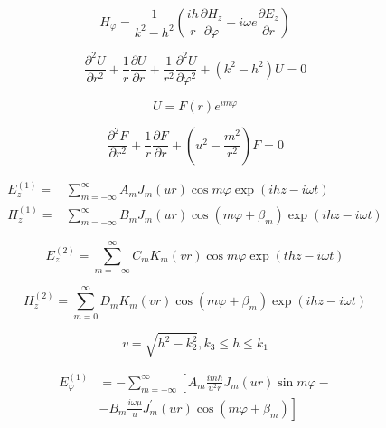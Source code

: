  \begin{equation}
 H_{\varphi}=\frac{1}{k^{2}-h^{2}}\left(\frac{i h}{r} \frac{\partial H_{z}}{\partial \varphi}+i \omega e \frac{\partial E_{z}}{\partial r}\right)
 \end{equation}
 
 \begin{equation}
 \frac{\partial^{2} U}{\partial r^{2}}+\frac{1}{r} \frac{\partial U}{\partial r}+\frac{1}{r^{2}} \frac{\partial^{2} U}{\partial \varphi^{2}}+\left(k^{2}-h^{2}\right) U=0
 \end{equation}
 
 \begin{equation}U=F(r) e^{i m \varphi}\end{equation}
 
 \begin{equation}\frac{\partial^{2} F}{\partial r^{2}}+\frac{1}{r} \frac{\partial F}{\partial r}+\left(u^{2}-\frac{m^{2}}{r^{2}}\right) F=0\end{equation}
 
 
 \begin{equation}\begin{aligned}
 E_{z}^{(1)}=& \sum_{m=-\infty}^{\infty} A_{m} J_{m}(u r) \cos m \varphi \exp (i h z-i \omega t) \\
 H_{z}^{(1)}=& \sum_{m=-\infty}^{\infty} B_{m} J_{m}(u r) \cos \left(m \varphi+\beta_{m}\right) \exp (i h z-i \omega t)
 \end{aligned}\end{equation}
 
 
 \begin{equation}
 E_{z}^{(2)}=\sum_{m=-\infty}^{\infty} C_{m} K_{m}(v r) \cos m \varphi \exp (t h z-i \omega t)
 \end{equation}
 
 \begin{equation}
 H_{z}^{(2)}=\sum_{m=0}^{\infty} D_{m} K_{m}(v r) \cos \left(m \varphi+\beta_{m}\right) \exp (i h z-i \omega t)
 \end{equation}
 
 \begin{equation}
 v=\sqrt{h^{2}-k_{2}^{2}}, k_{3} \leqslant h \leqslant k_{1}
 \end{equation}
 
 \begin{equation}
 \begin{aligned}
 E_{\varphi}^{(1)} &=-\sum_{m=-\infty}^{\infty}\left[A_{m} \frac{i m h}{u^{2} r} J_{m}(u r) \sin m \varphi-\right.\\
 &\left.-B_{m} \frac{i \omega \mu}{u} J_{m}^{\prime}(u r) \cos \left(m \varphi+\beta_{m}\right)\right]
 \end{aligned}
 \end{equation}
 
